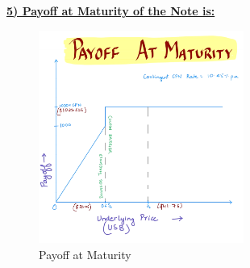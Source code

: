 \documentclass[12pt,a4paper]{article}
\begin{document}
\vspace{0.5cm}

\underline{\textbf{5) Payoff at Maturity of the Note is:}}
\begin{figure}[H]
    \centering
    \includegraphics[width=0.6\textwidth, height=0.3\textheight]{Images/payoff_project_1.png}
    \caption{Payoff at Maturity}
    \label{fig:yourlabel}
\end{figure}

\clearpage  %
\end{document}
